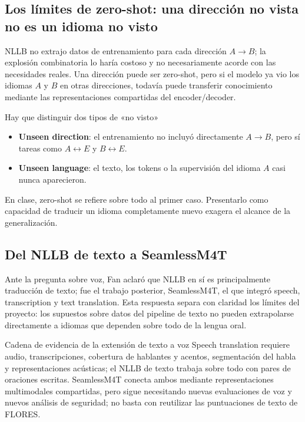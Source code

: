 \documentclass[a4paper]{article}
\begin{document}
\subsection{Los límites de zero-shot: una dirección no vista no es un idioma no visto}

NLLB no extrajo datos de entrenamiento para cada dirección $A\rightarrow B$; la explosión combinatoria lo haría costoso y no necesariamente acorde con las necesidades reales. Una dirección puede ser zero-shot, pero si el modelo ya vio los idiomas $A$ y $B$ en otras direcciones, todavía puede transferir conocimiento mediante las representaciones compartidas del encoder/decoder.

\begin{importantbox}{Hay que distinguir dos tipos de «no visto»}
\begin{itemize}
  \item \textbf{Unseen direction}: el entrenamiento no incluyó directamente $A\rightarrow B$, pero sí tareas como $A\leftrightarrow E$ y $B\leftrightarrow E$.
  \item \textbf{Unseen language}: el texto, los tokens o la supervisión del idioma $A$ casi nunca aparecieron.
\end{itemize}
En clase, zero-shot se refiere sobre todo al primer caso. Presentarlo como capacidad de traducir un idioma completamente nuevo exagera el alcance de la generalización.
\end{importantbox}


\subsection{Del NLLB de texto a SeamlessM4T}

Ante la pregunta sobre voz, Fan aclaró que NLLB en sí es principalmente traducción de texto; fue el trabajo posterior, SeamlessM4T, el que integró speech, transcription y text translation. Esta respuesta separa con claridad los límites del proyecto: los supuestos sobre datos del pipeline de texto no pueden extrapolarse directamente a idiomas que dependen sobre todo de la lengua oral.

\begin{knowledgebox}{Cadena de evidencia de la extensión de texto a voz}
Speech translation requiere audio, transcripciones, cobertura de hablantes y acentos, segmentación del habla y representaciones acústicas; el NLLB de texto trabaja sobre todo con pares de oraciones escritas. SeamlessM4T conecta ambos mediante representaciones multimodales compartidas, pero sigue necesitando nuevas evaluaciones de voz y nuevos análisis de seguridad; no basta con reutilizar las puntuaciones de texto de FLORES.
\end{knowledgebox}
\end{document}

